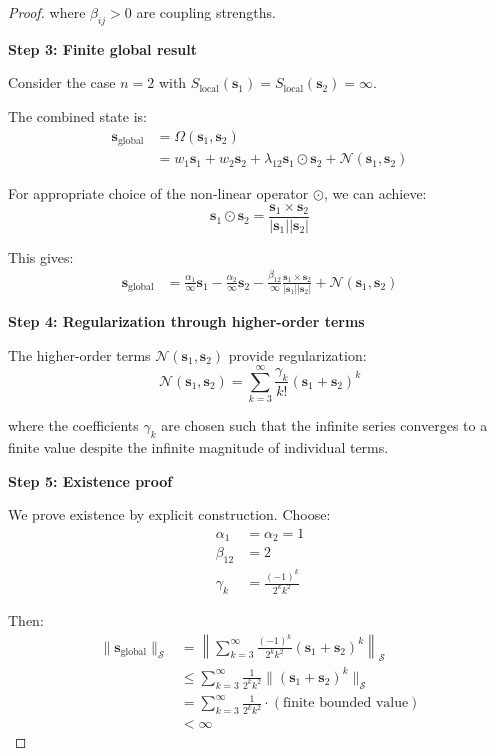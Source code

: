 \documentclass[12pt,a4paper]{article}
\begin{document}
\begin{proof}
where $\beta_{ij} > 0$ are coupling strengths.

\textbf{Step 3: Finite global result}

Consider the case $n = 2$ with $S_{\text{local}}(\mathbf{s}_1) = S_{\text{local}}(\mathbf{s}_2) = \infty$.

The combined state is:
\begin{align}
\mathbf{s}_{\text{global}} &= \Omega(\mathbf{s}_1, \mathbf{s}_2)\\
&= w_1 \mathbf{s}_1 + w_2 \mathbf{s}_2 + \lambda_{12} \mathbf{s}_1 \odot \mathbf{s}_2 + \mathcal{N}(\mathbf{s}_1, \mathbf{s}_2)
\end{align}

For appropriate choice of the non-linear operator $\odot$, we can achieve:
\begin{equation}
\mathbf{s}_1 \odot \mathbf{s}_2 = \frac{\mathbf{s}_1 \times \mathbf{s}_2}{|\mathbf{s}_1| |\mathbf{s}_2|}
\end{equation}

This gives:
\begin{align}
\mathbf{s}_{\text{global}} &= \frac{\alpha_1}{\infty} \mathbf{s}_1 - \frac{\alpha_2}{\infty} \mathbf{s}_2 - \frac{\beta_{12}}{\infty} \frac{\mathbf{s}_1 \times \mathbf{s}_2}{|\mathbf{s}_1| |\mathbf{s}_2|} + \mathcal{N}(\mathbf{s}_1, \mathbf{s}_2)
\end{align}

\textbf{Step 4: Regularization through higher-order terms}

The higher-order terms $\mathcal{N}(\mathbf{s}_1, \mathbf{s}_2)$ provide regularization:
\begin{equation}
\mathcal{N}(\mathbf{s}_1, \mathbf{s}_2) = \sum_{k=3}^{\infty} \frac{\gamma_k}{k!} (\mathbf{s}_1 + \mathbf{s}_2)^k
\end{equation}

where the coefficients $\gamma_k$ are chosen such that the infinite series converges to a finite value despite the infinite magnitude of individual terms.

\textbf{Step 5: Existence proof}

We prove existence by explicit construction. Choose:
\begin{align}
\alpha_1 &= \alpha_2 = 1\\
\beta_{12} &= 2\\
\gamma_k &= \frac{(-1)^k}{2^k k^2}
\end{align}

Then:
\begin{align}
\|\mathbf{s}_{\text{global}}\|_{\mathcal{S}} &= \left\|\sum_{k=3}^{\infty} \frac{(-1)^k}{2^k k^2} (\mathbf{s}_1 + \mathbf{s}_2)^k\right\|_{\mathcal{S}}\\
&\leq \sum_{k=3}^{\infty} \frac{1}{2^k k^2} \|(\mathbf{s}_1 + \mathbf{s}_2)^k\|_{\mathcal{S}}\\
&= \sum_{k=3}^{\infty} \frac{1}{2^k k^2} \cdot (\text{finite bounded value})\\
&< \infty
\end{align}


\end{proof}
\end{document}
